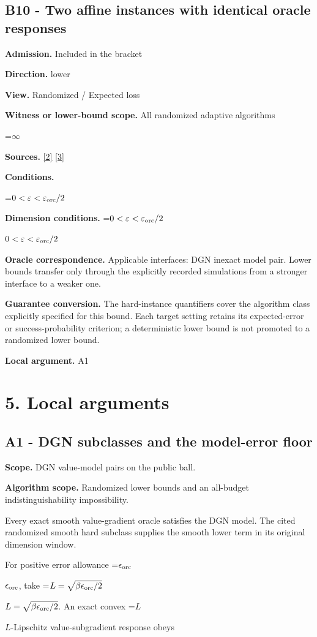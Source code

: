 \documentclass[10pt,a4paper]{article}
\newcommand{\AtlasMath}[1]{\par\begingroup\centering\setbox0=\hbox{$\displaystyle #1$}\ifdim\wd0>1.4\linewidth\typeout{ATLAS WIDE FORMULA: \the\wd0}\fi\ifdim\wd0>\linewidth\resizebox{\linewidth}{!}{\box0}\else\box0\fi\par\endgroup}
\newcommand{\AtlasInlineMath}[1]{\begingroup\setbox0=\hbox{$#1$}\ifdim\wd0>.4\linewidth\endgroup\AtlasMath{#1}\else\endgroup$#1$\fi}
\begin{document}
\subsection{B10 - Two affine instances with identical oracle responses}
\textbf{Admission.} Included in the bracket

\textbf{Direction.} lower

\textbf{View.} Randomized / Expected loss

\textbf{Witness or lower-bound scope.} All randomized adaptive algorithms

\AtlasMath{\infty}
\textbf{Sources.} \href{https://arxiv.org/pdf/2609.10874}{[2]} \href{https://arxiv.org/pdf/1407.5144}{[3]}

\textbf{Conditions.} 
\AtlasMath{0<\varepsilon<\varepsilon_{\rm orc}/2}


\textbf{Dimension conditions.} \AtlasInlineMath{0<\varepsilon<\varepsilon_{\rm orc}/2}

\textbf{Oracle correspondence.} Applicable interfaces: DGN inexact model pair. Lower bounds transfer only through the explicitly recorded simulations from a stronger interface to a weaker one.

\textbf{Guarantee conversion.} The hard-instance quantifiers cover the algorithm class explicitly specified for this bound. Each target setting retains its expected-error or success-probability criterion; a deterministic lower bound is not promoted to a randomized lower bound.

\textbf{Local argument.} A1

\section{5. Local arguments}
\subsection{A1 - DGN subclasses and the model-error floor}
\textbf{Scope.} DGN value-model pairs on the public ball.

\textbf{Algorithm scope.} Randomized lower bounds and an all-budget indistinguishability impossibility.

Every exact smooth value-gradient oracle satisfies the DGN model. The cited randomized smooth hard subclass supplies the smooth lower term in its original dimension window.

For positive error allowance \AtlasInlineMath{\epsilon_{\rm orc}}, take
\AtlasInlineMath{L=\sqrt{\beta\epsilon_{\rm orc}/2}}.
An exact convex \AtlasInlineMath{L}-Lipschitz value-subgradient response obeys
\end{document}
